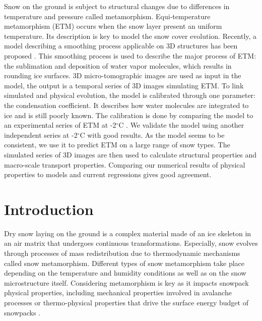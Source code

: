 \documentclass[draft,ms]{agujournal2019}
\begin{document}
Snow on the ground is subject to structural changes due to differences in temperature and pressure called metamorphism. Equi-temperature metamorphism (ETM) occurs when the snow layer present an uniform temperature. Its description is key to model the snow cover evolution. Recently, a model describing a smoothing process applicable on 3D structures has been proposed \cite{bretin_phase-field_2019}. This smoothing process is used to describe the major process of ETM: the sublimation and deposition of water vapor molecules, which results in rounding ice surfaces. 3D micro-tomographic images are used as input in the model, the output is a temporal series of 3D images simulating ETM. To link simulated and physical evolution, the model is calibrated through one parameter: the condensation coefficient. It describes how water molecules are integrated to ice and is still poorly known. The calibration is done by comparing the model to an experimental series of ETM at -2$^\circ$C \cite{flin_three-dimensional_2004}. We validate the model using another independent series at -2$^\circ$C \cite{hagenmuller_motion_2019} with good results. As the model seems to be consistent, we use it to predict ETM on a large range of snow types. The simulated series of 3D images are then used to calculate structural properties and macro-scale transport properties. Comparing our numerical results of physical properties to models and current regressions gives good agreement.

\section{Introduction}
\label{sec:intro}
Dry snow laying on the ground is a complex material made of an ice skeleton in an air matrix that undergoes continuous transformations. Especially, snow evolves through processes of mass redistribution due to thermodynamic mechanisms called snow metamorphism. Different types of snow metamorphism take place depending on the temperature and humidity conditions as well as on the snow microstructure itself. Considering metamorphism is key as it impacts snowpack physical properties, including mechanical properties involved in avalanche processes or thermo-physical properties that drive the surface energy budget of snowpacks \cite{vionnet_detailed_2012, lehning_physical_2002}.\\
\end{document}
